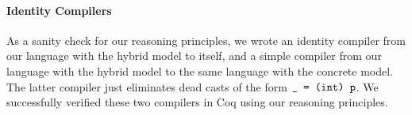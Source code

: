 \paragraph{Identity Compilers}
As a sanity check for our reasoning principles, we wrote an identity compiler from our language with the hybrid
model to itself, and a simple compiler from our language with the hybrid
model to the same language with the concrete model. The latter compiler just eliminates
dead casts of the form ${\texttt{\_ = (int) p}}$. We successfully verified these two compilers in Coq using our reasoning principles.











